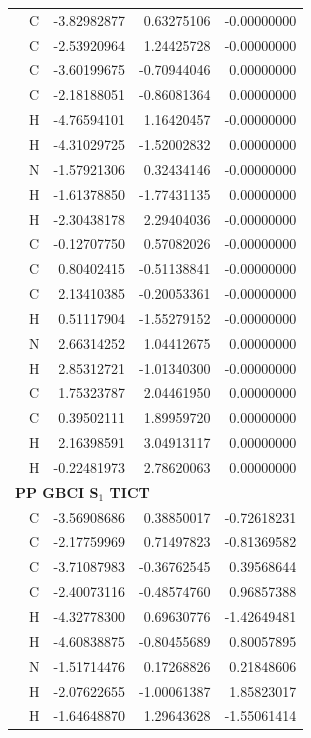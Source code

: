 \begin{longtable}{llrrr}
 & C & -3.82982877 &  0.63275106 & -0.00000000 \\
 & C & -2.53920964 &  1.24425728 & -0.00000000 \\
 & C & -3.60199675 & -0.70944046 &  0.00000000 \\
 & C & -2.18188051 & -0.86081364 &  0.00000000 \\
 & H & -4.76594101 &  1.16420457 & -0.00000000 \\
 & H & -4.31029725 & -1.52002832 &  0.00000000 \\
 & N & -1.57921306 &  0.32434146 & -0.00000000 \\
 & H & -1.61378850 & -1.77431135 &  0.00000000 \\
 & H & -2.30438178 &  2.29404036 & -0.00000000 \\
 & C & -0.12707750 &  0.57082026 & -0.00000000 \\
 & C &  0.80402415 & -0.51138841 & -0.00000000 \\
 & C &  2.13410385 & -0.20053361 & -0.00000000 \\
 & H &  0.51117904 & -1.55279152 & -0.00000000 \\
 & N &  2.66314252 &  1.04412675 &  0.00000000 \\
 & H &  2.85312721 & -1.01340300 & -0.00000000 \\
 & C &  1.75323787 &  2.04461950 &  0.00000000 \\
 & C &  0.39502111 &  1.89959720 &  0.00000000 \\
 & H &  2.16398591 &  3.04913117 &  0.00000000 \\
 & H & -0.22481973 &  2.78620063 &  0.00000000 \\
\multicolumn{5}{l}{\textbf{PP GBCI S$_1$ TICT}}\\
 & C & -3.56908686 &  0.38850017 & -0.72618231 \\
 & C & -2.17759969 &  0.71497823 & -0.81369582 \\
 & C & -3.71087983 & -0.36762545 &  0.39568644 \\
 & C & -2.40073116 & -0.48574760 &  0.96857388 \\
 & H & -4.32778300 &  0.69630776 & -1.42649481 \\
 & H & -4.60838875 & -0.80455689 &  0.80057895 \\
 & N & -1.51714476 &  0.17268826 &  0.21848606 \\
 & H & -2.07622655 & -1.00061387 &  1.85823017 \\
 & H & -1.64648870 &  1.29643628 & -1.55061414 \\

\end{longtable}
